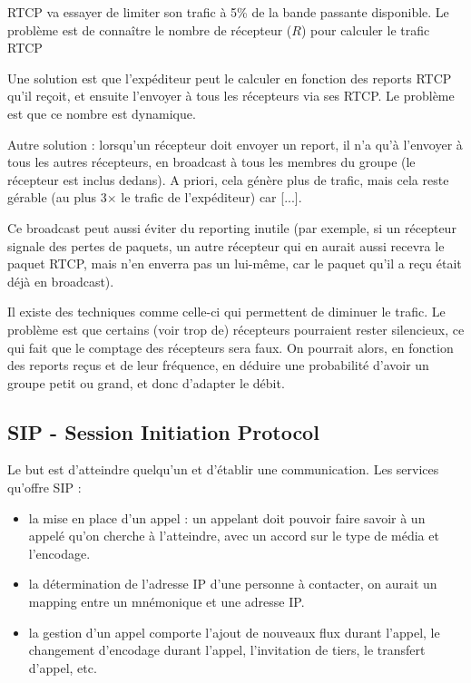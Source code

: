 \documentclass[10pt,a4paper]{report}
\begin{document}
		
		RTCP va essayer de limiter son trafic à 5\% de la bande passante disponible. Le problème est de connaître le nombre de récepteur ($R$) pour calculer le trafic RTCP
		
		 Une solution est que l'expéditeur peut le calculer en fonction des reports RTCP qu'il reçoit, et ensuite l'envoyer à tous les récepteurs via ses RTCP. Le problème est que ce nombre est dynamique.
		 
		 Autre solution : lorsqu'un récepteur doit envoyer un report, il n'a qu'à l'envoyer à tous les autres récepteurs, en broadcast à tous les membres du groupe (le récepteur est inclus dedans). A priori, cela génère plus de trafic, mais cela reste gérable (au plus 3$\times$ le trafic de l'expéditeur) car [...].
		 
		 Ce broadcast peut aussi éviter du reporting inutile (par exemple, si un récepteur signale des pertes de paquets, un autre récepteur qui en aurait aussi recevra le paquet RTCP, mais n'en enverra pas un lui-même, car le paquet qu'il a reçu était déjà en broadcast).
		 
		 Il existe des techniques comme celle-ci qui permettent de diminuer le trafic. Le problème est que certains (voir trop de) récepteurs pourraient rester silencieux, ce qui fait que le comptage des récepteurs sera faux. On pourrait alors, en fonction des reports reçus et de leur fréquence, en déduire une probabilité d'avoir un groupe petit ou grand, et donc d'adapter le débit.
		 
		\subsection{SIP - Session Initiation Protocol}
		
		Le but est d'atteindre quelqu'un et d'établir une communication. Les services qu'offre SIP :
		
		\begin{itemize}
			\item la mise en place d'un appel : un appelant doit pouvoir faire savoir à un appelé qu'on cherche à l'atteindre, avec un accord sur le type de média et l'encodage.
			\item la détermination de l'adresse IP d'une personne à contacter, on aurait un mapping entre un mnémonique et une adresse IP.
			\item la gestion d'un appel comporte l'ajout de nouveaux flux durant l'appel, le changement d'encodage durant l'appel, l'invitation de tiers, le transfert d'appel, etc.
		\end{itemize}
	
\end{document}
